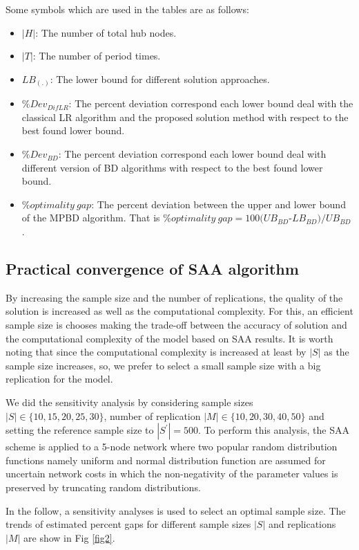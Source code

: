 \documentclass[review]{elsarticle}
\begin{document}
Some symbols which are used in the tables are as follows:

\begin{itemize}
\item
$|H|$: The number of total hub nodes.
\item
$|T|$: The number of period times.
\item
${LB}_{(.)}$: The lower bound for different solution approaches.
\item  ${\%Dev}_{DifLR}$: The percent deviation correspond each lower bound deal with the classical LR algorithm and the proposed solution method with respect to the best found lower bound.
\item  ${\%Dev}_{BD}$: The percent deviation correspond each lower bound deal with different version of BD algorithms with respect to the best found lower bound.
\item  $\%optimality~ gap$: The percent deviation between the upper and lower bound of the MPBD algorithm. That is $\%optimality~ gap=100(UB_{BD}$-$LB_{BD})/ UB_{BD}$.
\end{itemize}

\subsection{Practical convergence of SAA algorithm}

By increasing the sample size and the number of replications, the quality of the solution is increased as well as the computational complexity. For this, an efficient sample size is chooses making the trade-off between the accuracy of solution and the computational complexity of the model based on SAA results. It is worth noting that since the computational complexity is increased at least by $|S|$  as the sample size increases, so, we prefer to select a small sample size with a big replication for the model.

We did the sensitivity analysis by considering sample sizes $|S|\in \{ 10,15,20,25,30\} $, number of replication $|M|\in \{ 10,20,30,40,50\} $ and setting the reference sample size to $|S^{'} |=500$. To perform this analysis, the SAA scheme is applied to a 5-node network where two popular random distribution functions namely uniform and normal distribution function are assumed for uncertain network costs in which the non-negativity of the parameter values is preserved by truncating random distributions.

 In the follow, a sensitivity analyses is used to select an optimal sample size. The trends of estimated percent gaps for different sample sizes $|S|$ and replications $|M|$ are show in Fig \ref{fig2}. 
\end{document}
